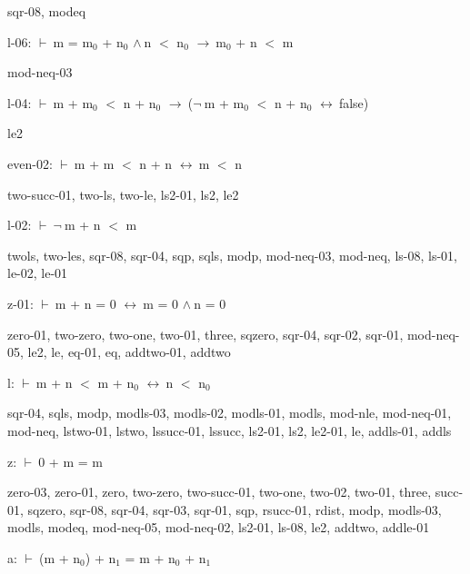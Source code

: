 \documentclass[a4paper]{article}
\newcommand{\Fol}{\mbox{$\vdash\ $}}
\newcommand{\Not}{\mbox{$\neg\ $}}
\newcommand{\And}{\mbox{$\wedge\ $}}
\newcommand{\Imp}{\mbox{$\rightarrow\ $}}
\newcommand{\Equiv}{\mbox{$\leftrightarrow\ $}}
\begin{document}
sqr-08, modeq

\bigskip

l-06: 
 \Fol m = $\mbox{m}_{0}$ + $\mbox{n}_{0}$ \And n $<$ $\mbox{n}_{0}$ \Imp $\mbox{m}_{0}$ + n $<$ m



mod-neq-03

\bigskip

l-04: 
 \Fol m + $\mbox{m}_{0}$ $<$ n + $\mbox{n}_{0}$ \Imp (\Not m + $\mbox{m}_{0}$ $<$ n + $\mbox{n}_{0}$ \Equiv false)



le2

\bigskip

even-02: 
 \Fol m + m $<$ n + n \Equiv m $<$ n



two-succ-01, two-ls, two-le, ls2-01, ls2, le2

\bigskip

l-02: 
 \Fol \Not m + n $<$ m



twols, two-les, sqr-08, sqr-04, sqp, sqls, modp, mod-neq-03, mod-neq, ls-08, ls-01, le-02, le-01

\bigskip

z-01: 
 \Fol m + n = 0 \Equiv m = 0 \And n = 0



zero-01, two-zero, two-one, two-01, three, sqzero, sqr-04, sqr-02, sqr-01, mod-neq-05, le2, le, eq-01, eq, addtwo-01, addtwo

\bigskip

l: 
 \Fol m + n $<$ m + $\mbox{n}_{0}$ \Equiv n $<$ $\mbox{n}_{0}$



sqr-04, sqls, modp, modls-03, modls-02, modls-01, modls, mod-nle, mod-neq-01, mod-neq, lstwo-01, lstwo, lssucc-01, lssucc, ls2-01, ls2, le2-01, le, addls-01, addls

\bigskip

z: 
 \Fol 0 + m = m



zero-03, zero-01, zero, two-zero, two-succ-01, two-one, two-02, two-01, three, succ-01, sqzero, sqr-08, sqr-04, sqr-03, sqr-01, sqp, rsucc-01, rdist, modp, modls-03, modls, modeq, mod-neq-05, mod-neq-02, ls2-01, ls-08, le2, addtwo, addle-01

\bigskip

a: 
 \Fol (m + $\mbox{n}_{0}$) + $\mbox{n}_{1}$ = m + $\mbox{n}_{0}$ + $\mbox{n}_{1}$
\end{document}
